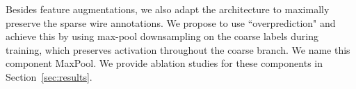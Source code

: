 
Besides feature augmentations, we also adapt the architecture to maximally preserve the sparse wire annotations.
We propose to use ``overprediction" and achieve this by using max-pool downsampling on the coarse labels during training, which preserves activation throughout the coarse branch. We name this component MaxPool. We provide ablation studies for these components in Section~\ref{sec:results}.

\vspace{-5mm}
